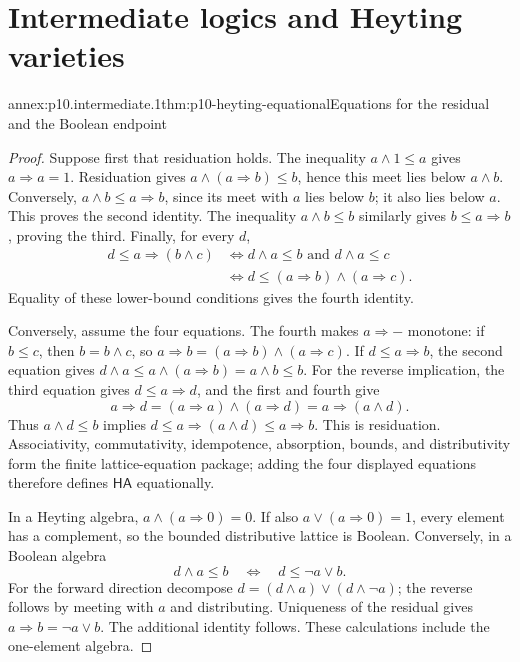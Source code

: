 
\section{Intermediate logics and Heyting varieties}

\begin{annexitem}{annex:p10.intermediate.1}{thm:p10-heyting-equational}{Equations for the residual and the Boolean endpoint}
\begin{proof}
Suppose first that residuation holds.
The inequality \(a\wedge1\leq a\) gives \(a\Rightarrow a=1\).
Residuation gives \(a\wedge(a\Rightarrow b)\leq b\), hence this
meet lies below \(a\wedge b\).
Conversely, \(a\wedge b\leq a\Rightarrow b\), since its meet with
\(a\) lies below \(b\); it also lies below \(a\).
This proves the second identity.
The inequality \(a\wedge b\leq b\) similarly gives
\(b\leq a\Rightarrow b\), proving the third.
Finally, for every \(d\),
\[
\begin{aligned}
 d\leq a\Rightarrow(b\wedge c)
 &\Longleftrightarrow d\wedge a\leq b\text{ and }d\wedge a\leq c\\
 &\Longleftrightarrow d\leq(a\Rightarrow b)\wedge(a\Rightarrow c).
\end{aligned}
\]
Equality of these lower-bound conditions gives the fourth identity.

Conversely, assume the four equations.
The fourth makes \(a\Rightarrow-\) monotone: if \(b\leq c\), then
\(b=b\wedge c\), so
\(a\Rightarrow b=(a\Rightarrow b)\wedge(a\Rightarrow c)\).
If \(d\leq a\Rightarrow b\), the second equation gives
\(d\wedge a\leq a\wedge(a\Rightarrow b)=a\wedge b\leq b\).
For the reverse implication, the third equation gives
\(d\leq a\Rightarrow d\), and the first and fourth give
\[
 a\Rightarrow d
  =(a\Rightarrow a)\wedge(a\Rightarrow d)
  =a\Rightarrow(a\wedge d).
\]
Thus \(a\wedge d\leq b\) implies
\(d\leq a\Rightarrow(a\wedge d)\leq a\Rightarrow b\).
This is residuation.
Associativity, commutativity, idempotence, absorption, bounds, and
distributivity form the finite lattice-equation package; adding the
four displayed equations therefore defines \(\mathsf{HA}\) equationally.

In a Heyting algebra, \(a\wedge(a\Rightarrow0)=0\).
If also \(a\vee(a\Rightarrow0)=1\), every element has a complement,
so the bounded distributive lattice is Boolean.
Conversely, in a Boolean algebra
\[
 d\wedge a\leq b\quad\Longleftrightarrow\quad d\leq\neg a\vee b.
\]
For the forward direction decompose
\(d=(d\wedge a)\vee(d\wedge\neg a)\); the reverse follows by
meeting with \(a\) and distributing.
Uniqueness of the residual gives \(a\Rightarrow b=\neg a\vee b\).
The additional identity follows.  These calculations include the
one-element algebra.
\end{proof}
\end{annexitem}

